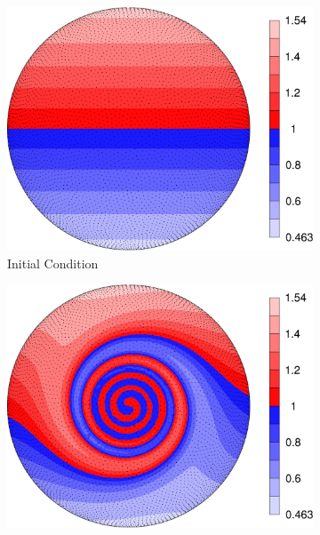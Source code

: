\documentclass{report}
\begin{document}
\begin{figure}[ht]
\begin{center}
\begin{subfigure}[b]{0.49\textwidth}
	\centering
	\includegraphics[width=1.0\textwidth]{../figures/paper1/figures/vortex_rollup/vortexInitialCondition-eps-converted-to.pdf}
	\caption{Initial Condition}
	\label{fig:vortex_initial}
\end{subfigure} 
\begin{subfigure}[b]{0.49\textwidth}
	\centering
	\includegraphics[width=1.0\textwidth]{../figures/paper1/figures/vortex_rollup/vortexComputedSolution-eps-converted-to.pdf}

\end{subfigure}
\end{center}
\end{figure}
\end{document}
